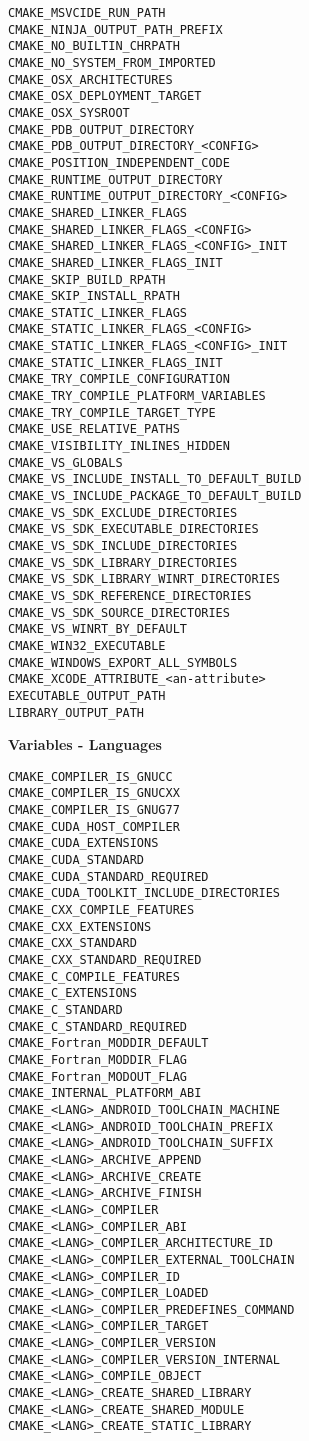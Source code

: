 \documentclass{article}
\begin{document}
\hfill\vline\hfill
\begin{minipage}[t]{0.18\linewidth}
\begin{verbatim}
CMAKE_MSVCIDE_RUN_PATH
CMAKE_NINJA_OUTPUT_PATH_PREFIX
CMAKE_NO_BUILTIN_CHRPATH
CMAKE_NO_SYSTEM_FROM_IMPORTED
CMAKE_OSX_ARCHITECTURES
CMAKE_OSX_DEPLOYMENT_TARGET
CMAKE_OSX_SYSROOT
CMAKE_PDB_OUTPUT_DIRECTORY
CMAKE_PDB_OUTPUT_DIRECTORY_<CONFIG>
CMAKE_POSITION_INDEPENDENT_CODE
CMAKE_RUNTIME_OUTPUT_DIRECTORY
CMAKE_RUNTIME_OUTPUT_DIRECTORY_<CONFIG>
CMAKE_SHARED_LINKER_FLAGS
CMAKE_SHARED_LINKER_FLAGS_<CONFIG>
CMAKE_SHARED_LINKER_FLAGS_<CONFIG>_INIT
CMAKE_SHARED_LINKER_FLAGS_INIT
CMAKE_SKIP_BUILD_RPATH
CMAKE_SKIP_INSTALL_RPATH
CMAKE_STATIC_LINKER_FLAGS
CMAKE_STATIC_LINKER_FLAGS_<CONFIG>
CMAKE_STATIC_LINKER_FLAGS_<CONFIG>_INIT
CMAKE_STATIC_LINKER_FLAGS_INIT
CMAKE_TRY_COMPILE_CONFIGURATION
CMAKE_TRY_COMPILE_PLATFORM_VARIABLES
CMAKE_TRY_COMPILE_TARGET_TYPE
CMAKE_USE_RELATIVE_PATHS
CMAKE_VISIBILITY_INLINES_HIDDEN
CMAKE_VS_GLOBALS
CMAKE_VS_INCLUDE_INSTALL_TO_DEFAULT_BUILD
CMAKE_VS_INCLUDE_PACKAGE_TO_DEFAULT_BUILD
CMAKE_VS_SDK_EXCLUDE_DIRECTORIES
CMAKE_VS_SDK_EXECUTABLE_DIRECTORIES
CMAKE_VS_SDK_INCLUDE_DIRECTORIES
CMAKE_VS_SDK_LIBRARY_DIRECTORIES
CMAKE_VS_SDK_LIBRARY_WINRT_DIRECTORIES
CMAKE_VS_SDK_REFERENCE_DIRECTORIES
CMAKE_VS_SDK_SOURCE_DIRECTORIES
CMAKE_VS_WINRT_BY_DEFAULT
CMAKE_WIN32_EXECUTABLE
CMAKE_WINDOWS_EXPORT_ALL_SYMBOLS
CMAKE_XCODE_ATTRIBUTE_<an-attribute>
EXECUTABLE_OUTPUT_PATH
LIBRARY_OUTPUT_PATH
\end{verbatim}

\textbf{Variables - Languages}
\begin{verbatim}
CMAKE_COMPILER_IS_GNUCC
CMAKE_COMPILER_IS_GNUCXX
CMAKE_COMPILER_IS_GNUG77
CMAKE_CUDA_HOST_COMPILER
CMAKE_CUDA_EXTENSIONS
CMAKE_CUDA_STANDARD
CMAKE_CUDA_STANDARD_REQUIRED
CMAKE_CUDA_TOOLKIT_INCLUDE_DIRECTORIES
CMAKE_CXX_COMPILE_FEATURES
CMAKE_CXX_EXTENSIONS
CMAKE_CXX_STANDARD
CMAKE_CXX_STANDARD_REQUIRED
CMAKE_C_COMPILE_FEATURES
CMAKE_C_EXTENSIONS
CMAKE_C_STANDARD
CMAKE_C_STANDARD_REQUIRED
CMAKE_Fortran_MODDIR_DEFAULT
CMAKE_Fortran_MODDIR_FLAG
CMAKE_Fortran_MODOUT_FLAG
CMAKE_INTERNAL_PLATFORM_ABI
CMAKE_<LANG>_ANDROID_TOOLCHAIN_MACHINE
CMAKE_<LANG>_ANDROID_TOOLCHAIN_PREFIX
CMAKE_<LANG>_ANDROID_TOOLCHAIN_SUFFIX
CMAKE_<LANG>_ARCHIVE_APPEND
CMAKE_<LANG>_ARCHIVE_CREATE
CMAKE_<LANG>_ARCHIVE_FINISH
CMAKE_<LANG>_COMPILER
CMAKE_<LANG>_COMPILER_ABI
CMAKE_<LANG>_COMPILER_ARCHITECTURE_ID
CMAKE_<LANG>_COMPILER_EXTERNAL_TOOLCHAIN
CMAKE_<LANG>_COMPILER_ID
CMAKE_<LANG>_COMPILER_LOADED
CMAKE_<LANG>_COMPILER_PREDEFINES_COMMAND
CMAKE_<LANG>_COMPILER_TARGET
CMAKE_<LANG>_COMPILER_VERSION
CMAKE_<LANG>_COMPILER_VERSION_INTERNAL
CMAKE_<LANG>_COMPILE_OBJECT
CMAKE_<LANG>_CREATE_SHARED_LIBRARY
CMAKE_<LANG>_CREATE_SHARED_MODULE
CMAKE_<LANG>_CREATE_STATIC_LIBRARY
\end{verbatim}
\end{minipage}
\end{document}
